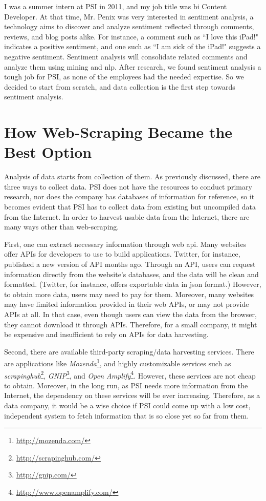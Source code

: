 \documentclass[12pt]{report}
\begin{document}
I was a summer intern at PSI in 2011, and my job title was \gls{bi} Content Developer. At that time, Mr. Penix was very interested in sentiment analysis, a technology aims to discover and analyze sentiment reflected through comments, reviews, and blog posts alike. For instance, a comment such as ``I love this iPad!" indicates a positive sentiment, and one such as ``I am sick of the iPad!" suggests a negative sentiment. Sentiment analysis will consolidate related comments and analyze them using \gls{mining} and \gls{nlp}. After research, we found sentiment analysis a tough job for PSI, as none of the employees had the needed expertise. So we decided to start from scratch, and data collection is the first step towards sentiment analysis.

\section{How Web-Scraping Became the Best Option}

Analysis of data starts from collection of them. As previously discussed, there are three ways to collect data. PSI does not have the resources to conduct primary research, nor does the company has databases of information for reference, so it becomes evident that PSI has to collect data from existing but uncompiled data from the Internet. In order to \gls{harvest} usable data from the Internet, there are many ways other than web-scraping.

First, one can extract necessary information through web \gls{api}. Many websites offer APIs for developers to use to build applications. Twitter, for instance, published a new version of API months ago. Through an API, users can request information directly from the website's databases, and the data will be clean and formatted. (Twitter, for instance, offers exportable data in \gls{json} format.) However, to obtain more data, users may need to pay for them. Moreover, many websites may have limited information provided in their web APIs, or may not provide APIs at all. In that case, even though users can view the data from the browser, they cannot download it through APIs. Therefore, for a small company, it might be expensive and insufficient to rely on APIs for data harvesting.

Second, there are available third-party scraping/data harvesting services. There are applications like \textit{Mozenda}\footnote{\url{http://mozenda.com/}}, and highly customizable services such as \textit{scrapinghub}\footnote{\url{http://scrapinghub.com/}}, \textit{GNIP}\footnote{\url{http://gnip.com/}}, and \textit{Open Amplify}\footnote{\url{http://www.openamplify.com/}}. However, these services are not cheap to obtain. Moreover, in the long run, as PSI needs more information from the Internet, the dependency on these services will be ever increasing. Therefore, as a data company, it would be a wise choice if PSI could come up with a low cost, independent system to fetch information that is so close yet so far from them. 
\end{document}
